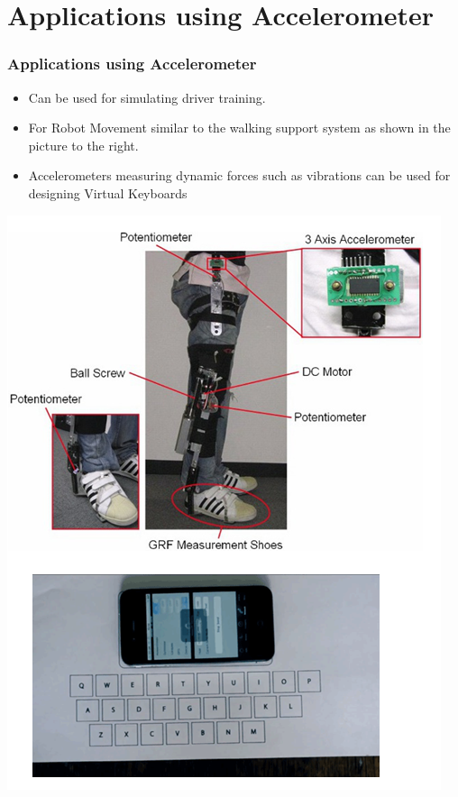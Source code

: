 \documentclass[table,10pt,red]{beamer}	%
\begin{document}
\section{Applications using Accelerometer} 
\begin{frame}
	\frametitle{Applications using Accelerometer}
\pause
 		

\begin{minipage}[c]{0.6\textwidth}
			\begin{itemize}
\justifying
\item <+-|alert@+>  Can be used for simulating driver training.
\item <+-|alert@+>  For Robot Movement similar to the walking support system as shown in the picture to the right.
\item <+-|alert@+> Accelerometers measuring dynamic forces such as vibrations can be used for designing Virtual Keyboards



\end{itemize}
		\end{minipage}
\begin{minipage}[c]{0.37\textwidth}
\hspace*{5mm}\includegraphics[width=\linewidth]{a1.png}
		\end{minipage}

\end{frame}
\end{document}
